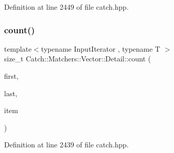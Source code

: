 Definition at line 2449 of file catch.\+hpp.

\mbox{\label{namespace_catch_1_1_matchers_1_1_vector_1_1_detail_abca18680db20c92f848b02a2c2708852}} 
\subsubsection{\texorpdfstring{count()}{count()}}
{\footnotesize\ttfamily template$<$typename Input\+Iterator , typename T $>$ \\
size\+\_\+t Catch\+::\+Matchers\+::\+Vector\+::\+Detail\+::count (\begin{DoxyParamCaption}\item[{Input\+Iterator}]{first,  }\item[{Input\+Iterator}]{last,  }\item[{T const \&}]{item }\end{DoxyParamCaption})}



Definition at line 2439 of file catch.\+hpp.

